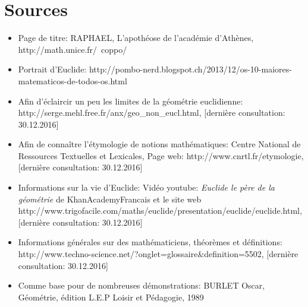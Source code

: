 \documentclass[a4paper,12pt]{article}
\begin{document}
\section{Sources}
\begin{itemize}
    \item Page de titre: RAPHAEL, L'apothéose de l'académie d'Athènes,\\ http://math.unice.fr/~coppo/
    
    \item Portrait d'Euclide: http://pombo-nerd.blogspot.ch/2013/12/os-10-maiores-matematicos-de-todos-os.html
    
    \item Afin d'éclaircir un peu les limites de la géométrie euclidienne:\\ http://serge.mehl.free.fr/anx/geo\_non\_eucl.html, [dernière consultation: 30.12.2016]
    
    \item Afin de connaître l'étymologie de notions mathématiques: Centre National de Ressources Textuelles et Lexicales, Page web: http://www.cnrtl.fr/etymologie, [dernière consultation: 30.12.2016]
    
    \item Informations sur la vie d'Euclide: Vidéo youtube: \textit{Euclide le père de la géométrie} de KhanAcademyFrancais et le site web\\ http://www.trigofacile.com/maths/euclide/presentation/euclide/euclide.html, [dernière consultation: 30.12.2016]
    
    \item Informations générales sur des mathématiciens, théorèmes et définitions: http://www.techno-science.net/?onglet=glossaire\&definition=5502, [dernière consultation: 30.12.2016]
    
    \item  Comme base pour de nombreuses démonstrations: BURLET Oscar, Géométrie, édition L.E.P Loisir et Pédagogie, 1989
\end{itemize}
\end{document}

